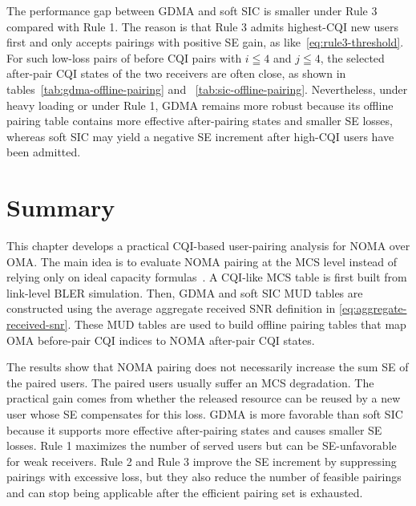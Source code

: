 The performance gap between GDMA and soft SIC is smaller under Rule 3 compared with Rule 1. 
The reason is that Rule 3 admits highest-CQI new users first and only accepts pairings with positive SE gain, as like~\eqref{eq:rule3-threshold}. For such low-loss pairs of before CQI pairs with $i\leqq4$ and $j\leqq4$, 
the selected after-pair CQI states of the two receivers are often close, as shown in tables~\ref{tab:gdma-offline-pairing} and ~\ref{tab:sic-offline-pairing}. 
Nevertheless, under heavy loading or under Rule 1, GDMA remains more robust because its offline pairing table contains more effective after-pairing states and smaller SE losses, whereas soft SIC may yield a negative SE increment after high-CQI users have been admitted.

\section{Summary}
\label{sec:cqi-summary}

This chapter develops a practical CQI-based user-pairing analysis for NOMA over OMA. The main idea is to evaluate NOMA pairing at the MCS level instead of relying only on ideal capacity formulas~\cite{marcano2017novel}. A CQI-like MCS table is first built from link-level BLER simulation. Then, GDMA and soft SIC MUD tables are constructed using the average aggregate received SNR definition in \eqref{eq:aggregate-received-snr}. These MUD tables are used to build offline pairing tables that map OMA before-pair CQI indices to NOMA after-pair CQI states.

The results show that NOMA pairing does not necessarily increase the sum SE of the paired users. The paired users usually suffer an MCS degradation. The practical gain comes from whether the released resource can be reused by a new user whose SE compensates for this loss. 
GDMA is more favorable than soft SIC because it supports more effective after-pairing states and causes smaller SE losses. 
Rule 1 maximizes the number of served users but can be SE-unfavorable for weak receivers. 
Rule 2 and Rule 3 improve the SE increment by suppressing pairings with excessive loss, but they also reduce the number of feasible pairings and can stop being applicable after the efficient pairing set is exhausted.
